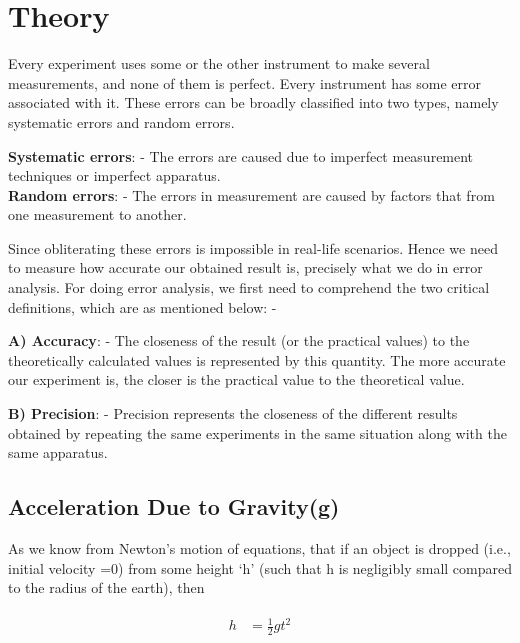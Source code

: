 \documentclass[11pt]{scrartcl} %
\begin{document}
\section{Theory}
Every experiment uses some or the other instrument to make several measurements, and none of them is perfect. Every instrument has some error associated with it. These errors can be broadly classified into two types, namely systematic errors and random errors.\par 
\textbf{Systematic errors}: - The errors are caused due to imperfect measurement techniques or imperfect apparatus. \\
\textbf{Random errors}: - The errors in measurement are caused by factors that from one measurement to another. \par 

Since obliterating these errors is impossible in real-life scenarios. Hence we need to measure how accurate our obtained result is, precisely what we do in error analysis. For doing error analysis, we first need to comprehend the two critical definitions, which are as mentioned below: - \par 

\textbf{A) Accuracy}: - The closeness of the result (or the practical values) to the theoretically calculated values is represented by this quantity. The more accurate our experiment is, the closer is the practical value to the theoretical value.\par

\textbf{B) Precision}: - Precision represents the closeness of the different results obtained by repeating the same experiments in the same situation along with the same apparatus. \par

\subsection{Acceleration Due to Gravity(g)}

As we know from Newton’s motion of equations, that if an object is dropped (i.e., initial velocity =0) from some height ‘h’ (such that h is negligibly small compared to the radius of the earth), then  \par

\begin{align} 
	\begin{split}
		h &= \frac{1}{2}gt^2\\
	\end{split}					
\end{align}
\end{document}
